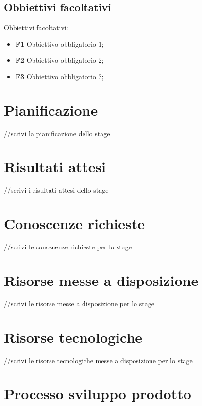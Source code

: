 \subsection{Obbiettivi facoltativi}
Obbiettivi facoltativi:
\begin{itemize}
    \item \textbf{F1} Obbiettivo obbligatorio 1;
    \item \textbf{F2} Obbiettivo obbligatorio 2;
    \item \textbf{F3} Obbiettivo obbligatorio 3;

\end{itemize}
\section{Pianificazione}
\label{sec:pianificazione}
//scrivi la pianificazione dello stage\\

\section{Risultati attesi}
\label{sec:risultati-attesi}
//scrivi i risultati attesi dello stage\\
\section{Conoscenze richieste}
\label{sec:conoscenze-richieste}
//scrivi le conoscenze richieste per lo stage\\
\section{Risorse messe a disposizione}
\label{sec:risorse-messe-a-disposizione}
//scrivi le risorse messe a disposizione per lo stage\\

\section{Risorse tecnologiche}
\label{sec:risorse-tecnologiche}
//scrivi le risorse tecnologiche messe a disposizione per lo stage\\


\section{Processo sviluppo prodotto}
